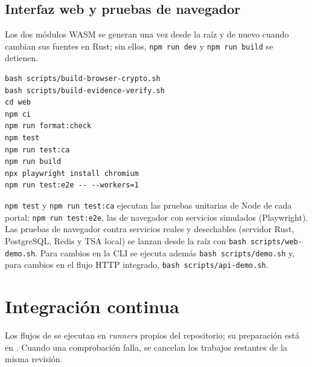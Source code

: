 \subsection{Interfaz web y pruebas de navegador}\label{sec:mant-web}

Los dos módulos WASM se generan una vez desde la raíz y de nuevo cuando
cambian sus fuentes en Rust; sin ellos, \texttt{npm run dev} y
\texttt{npm run build} se detienen.

\begin{verbatim}
bash scripts/build-browser-crypto.sh
bash scripts/build-evidence-verify.sh
cd web
npm ci
npm run format:check
npm test
npm run test:ca
npm run build
npx playwright install chromium
npm run test:e2e -- --workers=1
\end{verbatim}

\texttt{npm test} y \texttt{npm run test:ca} ejecutan las pruebas unitarias
de Node de cada portal; \texttt{npm run test:e2e}, las de navegador con
servicios simulados (Playwright). Las pruebas de navegador contra servicios
reales y desechables (servidor Rust, PostgreSQL, Redis y TSA local) se lanzan
desde la raíz con \texttt{bash scripts/web-demo.sh}. Para cambios en la CLI se
ejecuta además \texttt{bash scripts/demo.sh} y, para cambios en el flujo HTTP
integrado, \texttt{bash scripts/api-demo.sh}.

\section{Integración continua}\label{sec:mant-ci}

Los flujos de  se ejecutan en \emph{runners}
propios del repositorio; su preparación está en
. Cuando una comprobación falla, se
cancelan los trabajos restantes de la misma revisión.

